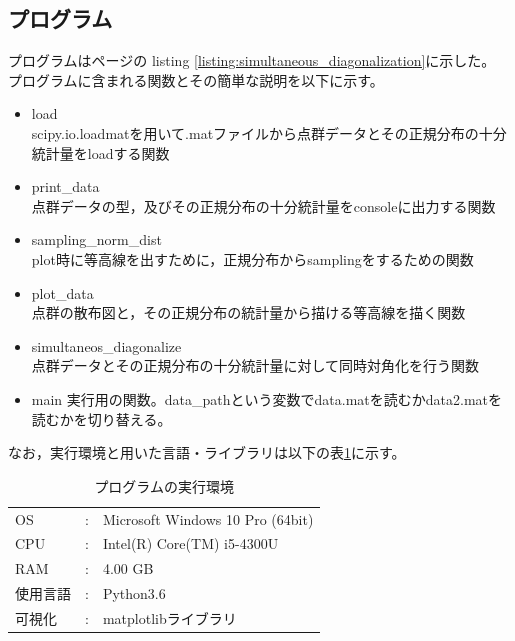 \documentclass[dvipdfmx, fleqn]{jsarticle}
\begin{document}
\clearpage
\subsection*{プログラム}

プログラムは\pageref{listing:simultaneous_diagonalization}ページの
listing \ref{listing:simultaneous_diagonalization}に示した。
プログラムに含まれる関数とその簡単な説明を以下に示す。

\begin{itemize}
	\item load \\
		scipy.io.loadmatを用いて.matファイルから点群データとその正規分布の十分統計量をloadする関数
	\item print\_data \\
		点群データの型，及びその正規分布の十分統計量をconsoleに出力する関数
	\item sampling\_norm\_dist \\
		plot時に等高線を出すために，正規分布からsamplingをするための関数
	\item plot\_data \\
		点群の散布図と，その正規分布の統計量から描ける等高線を描く関数
	\item simultaneos\_diagonalize \\
		点群データとその正規分布の十分統計量に対して同時対角化を行う関数
	\item main
		実行用の関数。data\_pathという変数でdata.matを読むかdata2.matを読むかを切り替える。
\end{itemize}


なお，実行環境と用いた言語・ライブラリは以下の表\ref{tab:cp_env}に示す。

\begin{table}[H]
	\centering
	\caption{プログラムの実行環境}
	\begin{tabular}{lcl}
		OS & : & Microsoft Windows 10 Pro (64bit) \\
		CPU & : & Intel(R) Core(TM) i5-4300U \\
		RAM & : & 4.00 GB \\
		使用言語 & : & Python3.6 \\
		可視化 & : & matplotlibライブラリ
	\end{tabular}
	\label{tab:cp_env}
\end{table}

\end{document}
